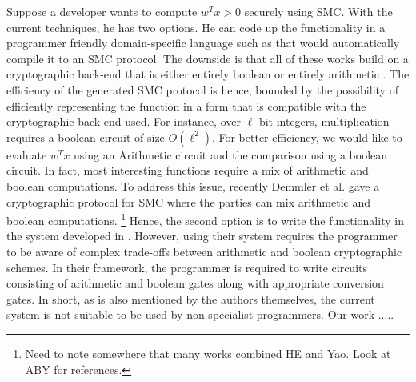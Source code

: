 Suppose a developer wants to compute $w^Tx >0$ securely using SMC. With the current techniques, he has two options.  He can code up the functionality in a programmer friendly domain-specific language such as \cite{lambdaps,wysteria,oblivm} that would automatically compile it to an SMC protocol. The downside is that all of these works build on a cryptographic back-end that is either entirely boolean \cite{yao,gmw} or entirely arithmetic \cite{homo}. The efficiency of the generated SMC protocol is hence, bounded by the possibility of efficiently representing the function in a form that is compatible with the cryptographic back-end used. For instance, over $\ell$-bit integers, multiplication requires a boolean circuit of size  $O(\ell^2)$. 
For better efficiency, we would like to evaluate $w^Tx$ using an Arithmetic circuit and the comparison using a boolean circuit.
In fact, most interesting functions require a mix of arithmetic and boolean computations.
To address this issue, recently Demmler et al. \cite{aby} gave a cryptographic protocol for SMC where the parties can mix arithmetic and boolean computations. \footnote{Need to note somewhere that many works combined HE and Yao. Look at ABY for references.}
Hence, the second option is to write the functionality in the system developed in \cite{aby}.
However, using their system requires the programmer to be aware of complex trade-offs between arithmetic and boolean cryptographic schemes. In their framework, the programmer is required to write circuits consisting of  arithmetic and boolean gates along with appropriate conversion gates. In short, as is also mentioned by the authors themselves, the current system is not suitable to be used by non-specialist programmers.  
Our work .....


